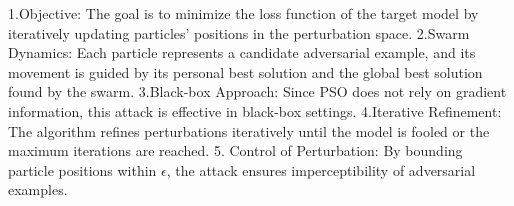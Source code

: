1.Objective: The goal is to minimize the loss function of the target model by iteratively updating particles' positions in the perturbation space.  
2.Swarm Dynamics: Each particle represents a candidate adversarial example, and its movement is guided by its personal best solution and the global best solution found by the swarm.  
3.Black-box Approach: Since PSO does not rely on gradient information, this attack is effective in black-box settings.  
4.Iterative Refinement: The algorithm refines perturbations iteratively until the model is fooled or the maximum iterations are reached.  
5. Control of Perturbation: By bounding particle positions within $\epsilon$, the attack ensures imperceptibility of adversarial examples.
